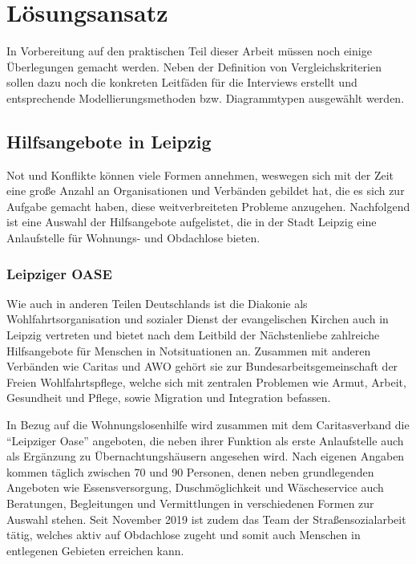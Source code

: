 \chapter{Lösungsansatz}\label{ch:approach}

In Vorbereitung auf den praktischen Teil dieser Arbeit müssen noch einige Überlegungen gemacht werden. Neben der Definition von Vergleichskriterien sollen dazu noch die konkreten Leitfäden für die Interviews erstellt und entsprechende Modellierungsmethoden bzw. Diagrammtypen ausgewählt werden.


\section{Hilfsangebote in Leipzig}

Not und Konflikte können viele Formen annehmen, weswegen sich mit der Zeit eine große Anzahl an Organisationen und Verbänden gebildet hat, die es sich zur Aufgabe gemacht haben, diese weitverbreiteten Probleme anzugehen. Nachfolgend ist eine Auswahl der Hilfsangebote aufgelistet, die in der Stadt Leipzig eine Anlaufstelle für Wohnungs- und Obdachlose bieten.


\subsection{Leipziger OASE}

Wie auch in anderen Teilen Deutschlands ist die Diakonie als Wohlfahrtsorganisation und sozialer Dienst der evangelischen Kirchen auch in Leipzig vertreten und bietet nach dem Leitbild der Nächstenliebe zahlreiche Hilfsangebote für Menschen in Notsituationen an. Zusammen mit anderen Verbänden wie Caritas und AWO gehört sie zur Bundesarbeitsgemeinschaft der Freien Wohlfahrtspflege, welche sich mit zentralen Problemen wie Armut, Arbeit, Gesundheit und Pflege, sowie Migration und Integration befassen.

In Bezug auf die Wohnungslosenhilfe wird zusammen mit dem Caritasverband die \enquote{Leipziger Oase} angeboten, die neben ihrer Funktion als erste Anlaufstelle auch als Ergänzung zu Übernachtungshäusern angesehen wird. Nach eigenen Angaben kommen täglich zwischen 70 und 90 Personen, denen neben grundlegenden Angeboten wie Essensversorgung, Duschmöglichkeit und Wäscheservice auch Beratungen, Begleitungen und Vermittlungen in verschiedenen Formen zur Auswahl stehen. Seit November 2019 ist zudem das Team der Straßensozialarbeit tätig, welches aktiv auf Obdachlose zugeht und somit auch Menschen in entlegenen Gebieten erreichen kann. \citep{Diakonie}

